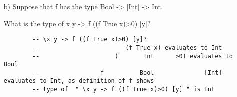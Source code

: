 \documentclass[10pt]{article}
\begin{document}
\begin{itemize}
\item[b)] Suppose that f has the type Bool -> [Int] -> Int.

What is the type of x y -> f ((f True x)>0) [y]?

	\begin{addmargin}[0em]{2em}
		\begin{lstlisting}
		-- \x y -> f ((f True x)>0) [y]?
		--                        (f True x) evaluates to Int
		--                     (       Int      >0) evaluates to Bool
		--                 f          Bool              [Int] evaluates to Int, as definition of f shows
		-- type of  " \x y -> f ((f True x)>0) [y] " is Int
		\end{lstlisting}
	\end{addmargin}


\end{itemize}
\end{document}
